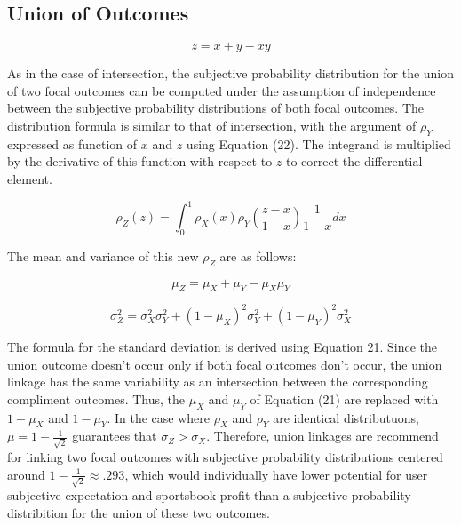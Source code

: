 \documentclass[sn-mathphys-num]{sn-jnl}
\theoremstyle{thmstyleone}%
\theoremstyle{thmstyletwo}%
\theoremstyle{thmstylethree}%
\begin{document}
\subsection{Union of Outcomes}

\begin{equation}
z = x + y - x y
\end{equation}
\vspace{.05in}

As in the case of intersection, the subjective probability distribution for the union of two focal outcomes can be computed under the assumption of independence between the subjective probability distributions of both focal outcomes. The distribution formula is similar to that of intersection, with the argument of $\rho_Y$ expressed as function of $x$ and $z$ using Equation (22). The integrand is multiplied by the derivative of this function with respect to $z$ to correct the differential element.

\begin{equation}
\rho_Z(z) = \int_{0}^{1}\rho_X(x) \rho_Y(\frac{z-x}{1-x})\frac{1}{1-x}dx
\end{equation}
\vspace{.05in}

The mean and variance of this new $\rho_Z$ are as follows:

\begin{equation}
\mu_Z = \mu_X + \mu_Y - \mu_X \mu_Y
\end{equation}

\begin{equation}
\sigma_Z^2 = \sigma_X^2 \sigma_Y^2 + (1-\mu_X)^2 \sigma_Y^2 + ( 1-\mu_Y)^2 \sigma_X^2
\end{equation}
\vspace{.05in}

The formula for the standard deviation is derived using Equation 21. Since the union outcome doesn't occur only if both focal outcomes don't occur, the union linkage has the same variability as an intersection between the corresponding compliment outcomes. Thus, the $\mu_X$ and $\mu_Y$ of Equation (21) are replaced with $1-\mu_X$ and $1-\mu_Y$. In the case where $\rho_X$ and $\rho_Y$ are identical distributuons, $\mu = 1-\frac{1}{\sqrt{2}}$ guarantees that $\sigma_Z > \sigma_X$. Therefore, union linkages are recommend for linking two focal outcomes with subjective probability distributions centered around $1-\frac{1}{\sqrt{2}} \approx .293$, which would individually have lower potential for user subjective expectation and sportsbook profit than a subjective probability distribition for the union of these two outcomes. 
\end{document}
